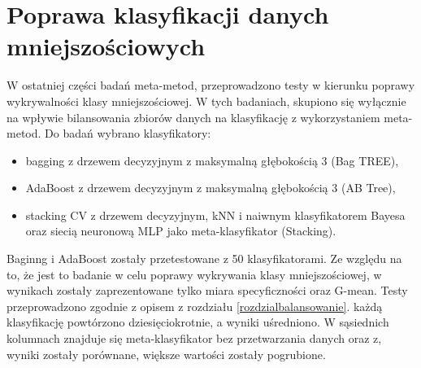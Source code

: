 \section{Poprawa klasyfikacji danych mniejszościowych}
W ostatniej części badań meta-metod, przeprowadzono testy w kierunku poprawy wykrywalności klasy mniejszościowej. W tych badaniach, skupiono się wyłącznie na wpływie bilansowania zbiorów danych na klasyfikację z wykorzystaniem meta-metod. Do badań wybrano klasyfikatory: 
\begin{itemize}
	\item bagging z drzewem decyzyjnym z maksymalną głębokością 3 (Bag TREE),
	\item AdaBoost z drzewem decyzyjnym z maksymalną głębokością 3 (AB Tree),
	\item stacking CV z drzewem decyzyjnym, kNN i naiwnym klasyfikatorem Bayesa oraz siecią neuronową MLP jako meta-klasyfikator (Stacking).
\end{itemize}
Baginng i AdaBoost zostały przetestowane z 50 klasyfikatorami. Ze względu na to, że jest to badanie w celu poprawy wykrywania klasy mniejszościowej, w wynikach zostały zaprezentowane tylko miara specyficzności oraz G-mean. Testy przeprowadzono zgodnie z opisem z rozdziału \ref{rozdzialbalansowanie}. każdą klasyfikację powtórzono dziesięciokrotnie, a wyniki uśredniono. W sąsiednich kolumnach znajduje się meta-klasyfikator bez przetwarzania danych oraz z, wyniki zostały porównane, większe wartości zostały pogrubione.
